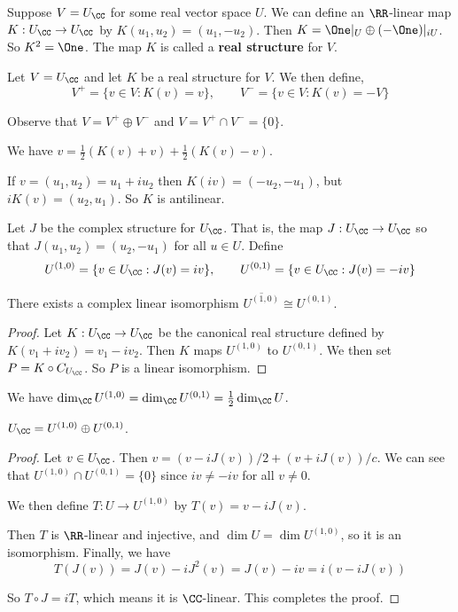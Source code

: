 \begin{defn}
Suppose $V = U_{\CC}$ for some real vector space $U$. We can define an $\RR$-linear map $K : U_{\CC} \to U_{\CC}$ by $K(u_1,u_2) = (u_1,-u_2)$. Then $K = \One|_{U} \oplus (-\One)|_{iU}$. So $K^2 = \One$. The map $K$ is called a \textbf{real structure} for $V$.
\end{defn}
\begin{defn}
Let $V=U_{\CC}$ and let $K$ be a real structure for $V$. We then define,
\begin{equation}V^+ = \{v\in V: K(v)=v\}, \qquad V^- = \{v\in V: K(v)=-V\}\end{equation}
\end{defn}
\begin{remark*}
    Observe that $V = V^+\oplus V^-$ and $V = V^+\cap V^- = \{0\}$. 
\end{remark*}
\begin{remark*}
    We have $v = \frac{1}{2}(K(v)+v) + \frac{1}{2}(K(v)-v)$. 
\end{remark*}
\begin{remark*}
    If $v = (u_1,u_2) = u_1+iu_2$ then $K(iv) = (-u_2,-u_1)$, but $iK(v) = (u_2,u_1)$. So $K$ is antilinear.
\end{remark*}
\begin{defn}
Let $J$ be the complex structure for $U_{\CC}$. That is, the map $J:U_{\CC}\to U_{\CC}$ so that $J(u_1,u_2) = (u_2,-u_1)$ for all $u \in U$.
Define 
\begin{equation}U^{(1,0)} = \{v \in U_{\CC} : J(v) = iv\},\qquad U^{(0,1)} = \{v\in U_{\CC} : J(v) = -iv\}\end{equation}
\end{defn}

\begin{lemma}
   There exists a complex linear isomorphism $\overline{U^{(1,0)}} \cong U^{(0,1)}$.\label{lemma:u10}
\end{lemma}
\begin{proof}
     Let $K : U_{\CC} \to U_{\CC}$ be the canonical real structure defined by $K(v_1+iv_2) = v_1-iv_2$. Then $K$ maps $U^{(1,0)}$ to $U^{(0,1)}$. We then set $P = K\circ C_{U_{\CC}}$. So $P$ is a linear isomorphism.
\end{proof}
\begin{cor}
We have $\dim_{\CC} U^{(1,0)} = \dim_{\CC} U^{(0,1)} = \frac{1}{2}\dim_{\CC} U$. 
\end{cor}
\begin{thm}
    $U_{\CC} = U^{(1,0)}\oplus U^{(0,1)}$. 
\end{thm}
\begin{proof}
    Let $v\in U_{\CC}$. Then $v=(v-iJ(v))/2 + (v+iJ(v))/c$. We can see that $U^{(1,0)}\cap U^{(0,1)}=\{0\}$ since $iv \neq -iv$ for all $v\neq 0$. 
    
    We then define $T : U \to U^{(1,0)}$ by $T(v) = v-iJ(v)$. 
    
    Then $T$ is $\RR$-linear and injective, and $\dim U = \dim U^{(1,0)}$, so it is an isomorphism. Finally, we have \[T(J(v)) = J(v)-iJ^2(v)=J(v)-iv = i(v-iJ(v))\]
    
    So $T\circ J = iT$, which means it is $\CC$-linear. This completes the proof.
\end{proof}
